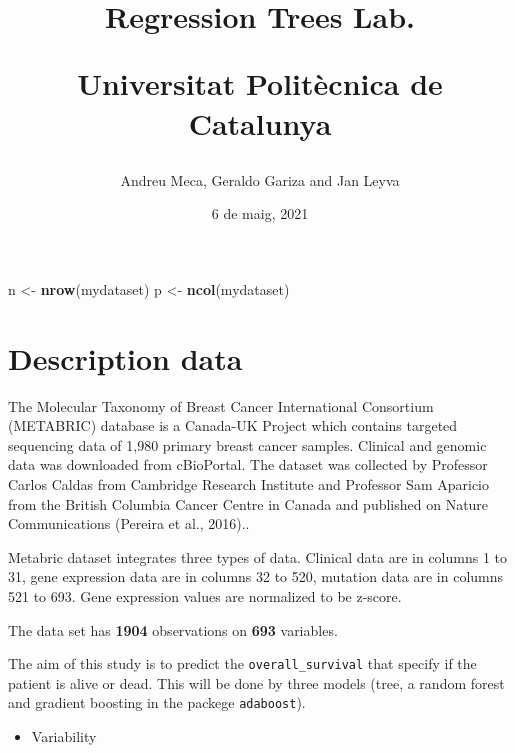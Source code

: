 \documentclass[
]{article}
\title{\textbf{Regression Trees Lab.}

Universitat Politècnica de Catalunya}
\author{Andreu Meca, Geraldo Gariza and Jan Leyva}
\date{6 de maig, 2021}
\newenvironment{Shaded}{\begin{snugshade}}{\end{snugshade}}
\newcommand{\DataTypeTok}[1]{\textcolor[rgb]{0.13,0.29,0.53}{#1}}
\newcommand{\DecValTok}[1]{\textcolor[rgb]{0.00,0.00,0.81}{#1}}
\newcommand{\KeywordTok}[1]{\textcolor[rgb]{0.13,0.29,0.53}{\textbf{#1}}}
\newcommand{\NormalTok}[1]{#1}
\newcommand{\OperatorTok}[1]{\textcolor[rgb]{0.81,0.36,0.00}{\textbf{#1}}}
\newcommand{\OtherTok}[1]{\textcolor[rgb]{0.56,0.35,0.01}{#1}}
\newcommand{\StringTok}[1]{\textcolor[rgb]{0.31,0.60,0.02}{#1}}
\providecommand{\tightlist}{%
  \setlength{\itemsep}{0pt}\setlength{\parskip}{0pt}}
\begin{document}
\maketitle

{
\setcounter{tocdepth}{2}
\tableofcontents
}
\newpage

\begin{Shaded}
\begin{Highlighting}[]
\NormalTok{n <-}\StringTok{ }\KeywordTok{nrow}\NormalTok{(mydataset)}
\NormalTok{p <-}\StringTok{ }\KeywordTok{ncol}\NormalTok{(mydataset)}
\end{Highlighting}
\end{Shaded}

\hypertarget{description-data}{%
\section{Description data}\label{description-data}}

The Molecular Taxonomy of Breast Cancer International Consortium
(METABRIC) database is a Canada-UK Project which contains targeted
sequencing data of 1,980 primary breast cancer samples. Clinical and
genomic data was downloaded from cBioPortal. The dataset was collected
by Professor Carlos Caldas from Cambridge Research Institute and
Professor Sam Aparicio from the British Columbia Cancer Centre in Canada
and published on Nature Communications (Pereira et al., 2016)..

Metabric dataset integrates three types of data. Clinical data are in
columns 1 to 31, gene expression data are in columns 32 to 520, mutation
data are in columns 521 to 693. Gene expression values are normalized to
be z-score.

The data set has \textbf{1904} observations on \textbf{693} variables.

The aim of this study is to predict the \texttt{overall\_survival} that
specify if the patient is alive or dead. This will be done by three
models (tree, a random forest and gradient boosting in the packege
\texttt{adaboost}).

\begin{itemize}
\tightlist
\item
  Variability
\end{itemize}

\begin{Shaded}
\end{Shaded}
\end{document}
